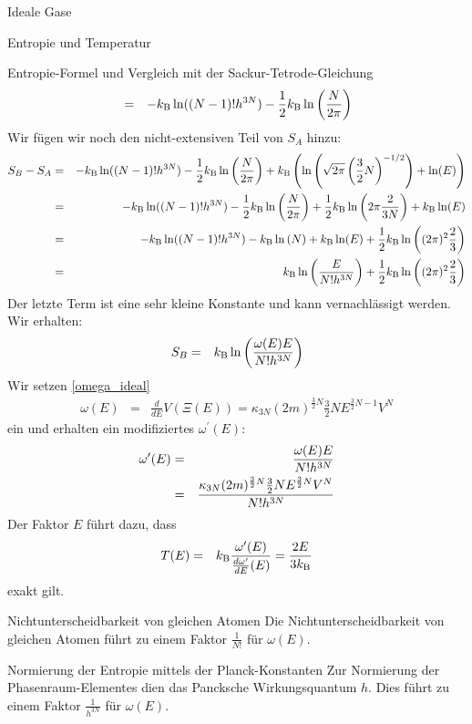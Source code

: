 \begin{chapter}{\titlestr}
\begin{section}{Ideale Gase}
\begin{subsection}{Entropie und Temperatur}
\begin{subsubsection}{Entropie-Formel und Vergleich mit der Sackur-Tetrode-Gleichung}
\begin{eqnarray*}
&=&- k_{\mathrm{B}} \ln((N-1)!h^{3N})-\frac{1}{2}k_{\mathrm{B}} \ln\left(\frac{N}{2\pi}\right)
\end{eqnarray*}
Wir fügen wir noch den nicht-extensiven Teil von $S_A$ hinzu:
\begin{eqnarray*}
S_B-S_A &=&- k_{\mathrm{B}} \ln((N-1)!h^{3N})-\frac{1}{2}k_{\mathrm{B}} \ln\left(\frac{N}{2\pi}\right)
+k_{\mathrm{B}} \left(\ln\left(\sqrt{2\pi}\left(\frac{3}{2}N\right)^{-1/2}\right)+\ln(E)\right)\\
 &=&- k_{\mathrm{B}} \ln((N-1)!h^{3N})-\frac{1}{2}k_{\mathrm{B}} \ln\left(\frac{N}{2\pi}\right)
+\frac{1}{2}k_{\mathrm{B}} \ln\left(2\pi \frac{2}{3N}\right)+k_{\mathrm{B}} \ln(E)\\
 &=&- k_{\mathrm{B}} \ln((N-1)!h^{3N})-k_{\mathrm{B}} \ln\left(N\right)
+k_{\mathrm{B}} \ln(E)+\frac{1}{2}k_{\mathrm{B}} \ln\left((2\pi)^2 \frac{2}{3}\right)\\
 &=&k_{\mathrm{B}} \ln\left(\frac{E}{N!h^{3N}}\right)+\frac{1}{2}k_{\mathrm{B}} \ln\left((2\pi)^2 \frac{2}{3}\right)
\end{eqnarray*}
Der letzte Term ist eine sehr kleine Konstante und kann vernachlässigt werden.
Wir erhalten:
\begin{eqnarray*}
S_B &=& k_{\mathrm{B}} \ln\left(\frac{\omega(E)E}{N!h^{3N}}\right)
\end{eqnarray*}
Wir setzen \ref{omega_ideal}
\begin{eqnarray*}
\omega(E) &=& \frac{d}{dE}V(\Xi(E))=\kappa_{3N}(2m)^{\frac{3}{2}N}\frac{3}{2}NE^{\frac{3}{2}N-1}V^N
\end{eqnarray*}
ein und erhalten ein modifiziertes $\omega^\prime(E)$:
\begin{eqnarray}
\label{correct_sigma}
\omega^\prime(E) &=& \frac{\omega(E)E}{N!h^{3N}}\cr
&=&\frac{\kappa_{3N}(2m)^{\frac{3}{2}N}\frac{3}{2}NE^{\frac{3}{2}N}V^N}{N!h^{3N}}
\end{eqnarray}
Der Faktor $E$ führt dazu, dass
\begin{eqnarray*}
T(E) &=& k_{\mathrm{B}} \frac{\omega^\prime(E)}{\frac{d\omega^\prime}{dE}(E)} = \frac{2E}{3k_{\mathrm{B}} }
\end{eqnarray*}
exakt gilt.
\end{subsubsection}

\begin{subsubsection}{Nichtunterscheidbarkeit von gleichen Atomen}
Die Nichtunterscheidbarkeit von gleichen Atomen führt zu einem Faktor $\frac{1}{N!}$ für $\omega(E)$.
\end{subsubsection}

\begin{subsubsection}{Normierung der Entropie mittels der Planck-Konstanten }
Zur Normierung der Phasenraum-Elementes dien das Pancksche Wirkungsquantum $h$. Dies führt zu einem Faktor $\frac{1}{h^{3N}}$ für $\omega(E)$.
\end{subsubsection}


\end{subsection}
\end{section}
\end{chapter}
